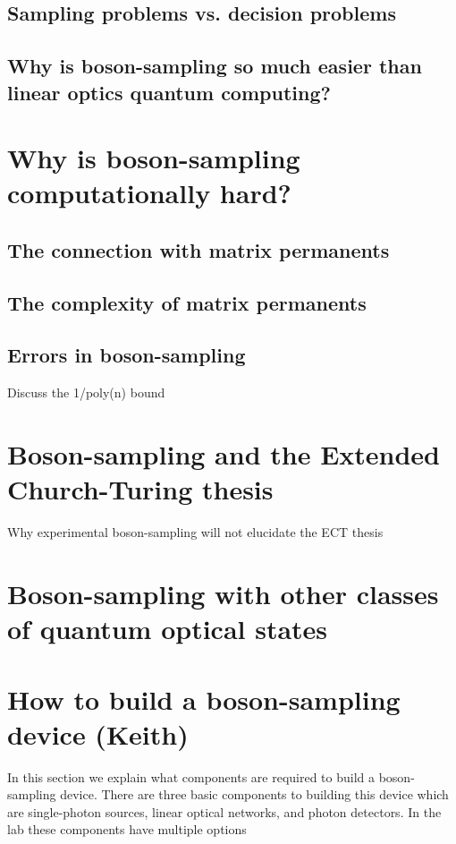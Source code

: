 \documentclass[aps,pra,twocolumn,amsmath,amssymb,nofootinbib,superscriptaddress]{revtex4}
\begin{document}
\subsection{Sampling problems vs. decision problems}

\subsection{Why is boson-sampling so much easier than linear optics quantum computing?}

\section{Why is boson-sampling computationally hard?}

\subsection{The connection with matrix permanents}

\subsection{The complexity of matrix permanents}

\subsection{Errors in boson-sampling}
Discuss the 1/poly(n) bound

\section{Boson-sampling and the Extended Church-Turing thesis}
Why experimental boson-sampling will not elucidate the ECT thesis

\section{Boson-sampling with other classes of quantum optical states}

\section{How to build a boson-sampling device (Keith)}

In this section we explain what components are required to build a boson-sampling device. There are three basic components to building this device which are single-photon sources, linear optical networks, and photon detectors. In the lab these components have multiple options 
\end{document}
